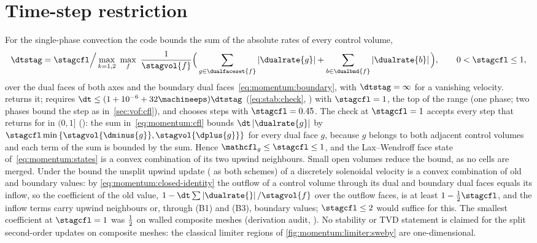 \section{Time-step restriction}\label{sec:momentum:cfl}
For the single-phase convection the code bounds the sum of the absolute rates
of every control volume,
\begin{equation}\label{eq:momentum:cfl}
  \dtstag=\stagcfl\Big/\max_{k=1,2}\ \max_{f}\ \frac{1}{\stagvol{f}}
    \Big(\sum_{g\in\dualfaceset{f}}\abs{\dualrate{g}}+\sum_{b\in\dualbnd{f}}\abs{\dualrate{b}}\Big),
  \qquad 0<\stagcfl\le1,
\end{equation}
over the dual faces of both axes and the boundary dual
faces~\cref{eq:momentum:boundary}, with $\dtstag=\infty$ for a vanishing
velocity.
returns it;  requires $\dt\le(1+10^{-6}+32\machineeps)\dtstag$ (\cref{eq:stab:check}, ) with
$\stagcfl=1$, the top of the range (one phase; two phases bound the step as
in~\cref{sec:vof:cfl}), and  chooses steps with
$\stagcfl=0.45$. The check at $\stagcfl=1$ accepts every step that
 returns for  in $(0,1]$ (): the
sum in~\cref{eq:momentum:cfl} bounds $\dt\abs{\dualrate{g}}$ by
$\stagcfl\min\curlypar{\stagvol{\dminus{g}},\stagvol{\dplus{g}}}$ for every
dual face $g$, because $g$ belongs to both adjacent control volumes and each
term of the sum is bounded by the sum. Hence $\mathcfl_g\le\stagcfl\le1$, and
the Lax--Wendroff face state of~\cref{eq:momentum:states} is a convex
combination of its two upwind neighbours.
Small open volumes reduce the bound, as no cells are merged. Under the bound
the unsplit upwind update ( as both schemes) of a discretely
solenoidal velocity is a convex combination of old and boundary values: by
\cref{eq:momentum:closed-identity} the outflow of a control volume through its
dual and boundary dual faces equals its inflow, so the coefficient of the old
value, $1-\dt\sum\abs{\dualrate{}}/\stagvol{f}$ over the outflow faces, is at
least $1-\half\stagcfl$, and the inflow terms carry upwind neighbours or,
through (B1) and (B3), boundary values; $\stagcfl\le2$ would suffice for
this. The smallest coefficient at $\stagcfl=1$ was $\frac{1}{2}$ on walled
composite meshes (derivation audit, ).
No stability or TVD statement is claimed for the split second-order updates
on composite meshes: the classical limiter regions of
\cref{fig:momentum:limiter:sweby} are one-dimensional.

